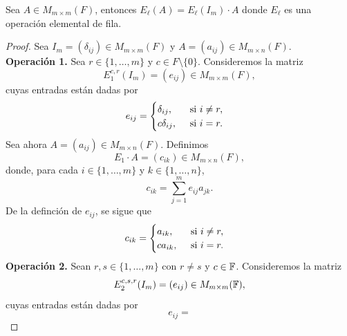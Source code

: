 \documentclass[12pt,a4paper]{book}
\begin{document}
    \begin{teorema}
        Sea $A\in M_{m\times m}(F)$, entonces $E_{\ell}(A)=E_{\ell}(I_{m})\cdot A$ donde
        $E_{\ell}$ es una operación elemental de fila.
    \end{teorema}
    \begin{proof}
        Sea $I_{m}=(\delta_{ij})\in M_{m\times m}(F)$ y $A=(a_{ij})\in M_{m\times n}(F)$.\\
        \textbf{Operación 1.} Sea $r\in\{1,\dots,m\}$ y $c\in F\setminus\{0\}$. Consideremos
        la matriz
        \begin{equation*}
            E_{1}^{c,r}(I_{m})=(e_{ij})\in M_{m\times m}(F),
        \end{equation*}
        cuyas entradas están dadas por
        \begin{equation*}
            e_{ij}=
            \begin{cases}
                \delta_{ij},\hfill\text{ si }i\neq r,\\
                c\delta_{ij},\quad\text{ si }i=r.
            \end{cases}
        \end{equation*}
        Sea ahora $A=(a_{ij})\in M_{m\times n}(F)$. Definimos
        \begin{equation*}
            E_{1}\cdot A=(c_{ik})\in M_{m\times n}(F),
        \end{equation*}
        donde, para cada $i\in\{1,\dots,m\}$ y $k\in\{1,\dots,n\}$,
        \begin{equation*}
            c_{ik}=\sum_{j=1}^{m}e_{ij}a_{jk}.
        \end{equation*}
        De la definción de $e_{ij}$, se sigue que
        \begin{equation*}
            c_{ik}=
            \begin{cases}
                a_{ik},\hfill\text{ si }i\neq r,\\
                ca_{ik},\quad\text{ si }i=r.
            \end{cases}
        \end{equation*}
        \textbf{Operación 2.} Sean $r,s\in\{1,\dots,m\}$ con $r\neq s$ y $c\in \mathbb{F}$. Consideremos la matriz
        \begin{equation*}
            E_{2}^{c,s,r}(I_{m})=(e_{ij})\in M_{m\times m}(\mathbb{F}),
        \end{equation*}
        cuyas entradas están dadas por
        \begin{equation*}
            e_{ij}=

\end{equation*}
\end{proof}
\end{document}
